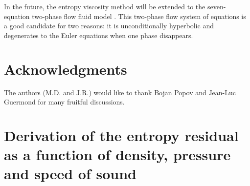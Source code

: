 \documentclass[preprint,10pt]{elsarticle}
\begin{document}
In the future, the entropy viscosity method will be extended to the seven-equation two-phase flow fluid model \cite{SEM}. 
This two-phase flow system of equations is a good candidate for two reasons: it is unconditionally hyperbolic 
and degenerates to the Euler equations when one phase disappears.


\section*{Acknowledgments} 
The authors (M.D. and J.R.) would like to thank Bojan Popov and Jean-Luc Guermond for many fruitful discussions.  


\newpage
\appendix

\section{Derivation of the entropy residual as a function of density, pressure and speed of sound} \label{app:ent_res}
\end{document}
